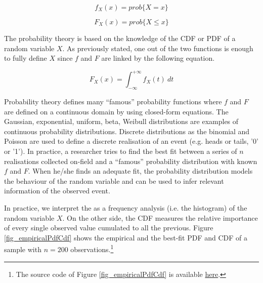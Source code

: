 \begin{equation}
f_X\left(x\right)=prob\{X=x\}
\label{eq_pdf}
\end{equation}

\begin{equation}
F_X\left(x\right)=prob\{X\le x\}
\label{eq_cdf}
\end{equation}

The probability theory is based on the knowledge of the CDF or PDF of a random variable $X$. As previously stated, one out of the two functions is enough to fully define $X$ since $f$ and $F$ are linked by the following equation.

\begin{equation}
F_X(x)=\int_{-\infty}^{+\infty}{f_X\left(t\right)\ dt}
\label{eq_cdfIntegralPdf}
\end{equation}

Probability theory defines many “famous” probability functions where $f$ and $F$ are defined on a continuous domain by using closed-form equations. The Gaussian, exponential, uniform, beta, Weibull distributions are examples of continuous probability distributions. Discrete distributions as the binomial and Poisson are used to define a discrete realisation of an event (e.g. heads or tails, '0' or '1'). In practice, a researcher tries to find the best fit between a series of $n$ realisations collected on-field and a “famous” probability distribution with known $f$ and $F$. When he/she finds an adequate fit, the probability distribution models the behaviour of the random variable and can be used to infer relevant information of the observed event.\par

In practice, we interpret the as a frequency analysis (i.e. the histogram) of the random variable $X$. On the other side, the CDF measures the relative importance of every single observed value cumulated to all the previous. Figure \ref{fig_empiricalPdfCdf} shows the empirical and the best-fit PDF and CDF of a sample with $n=200$ observations.\footnote{The source code of Figure \ref{fig_empiricalPdfCdf} is available \href{https://github.com/aletuf93/logproj/blob/master/examples/01.\%20Probability\%20Theory.ipynb}{here}.
}

